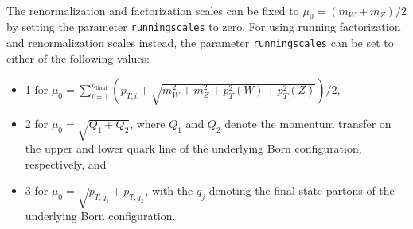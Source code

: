 \documentclass[a4paper,11pt]{article}
\begin{document}
\\[2ex]
The renormalization and factorization scales can be fixed to $\mu_0=(m_W+m_Z)/2$ by setting the parameter \texttt{runningscales}  to zero. For using running factorization and renormalization scales instead, the parameter \texttt{runningscales} can be set to either of the following values:
\begin{itemize}
	\item 1 for $\mu_0=\sum_{i=1}^{n_\text{final}}(p_{T,i}+\sqrt{m_W^2+m_Z^2+p_T^2(W)+p_T^2(Z)})/2$,
	\item 2 for $\mu_0=\sqrt{Q_1+Q_2}$, where $Q_1$ and $Q_2$ denote the momentum transfer on the upper and lower quark line of the underlying Born configuration, respectively, and 
	\item 3 for $\mu_0=\sqrt{p_{T,q_1}+p_{T,q_2}}$, with the $q_j$ denoting the final-state partons of the underlying Born configuration.
\end{itemize}
\end{document}
